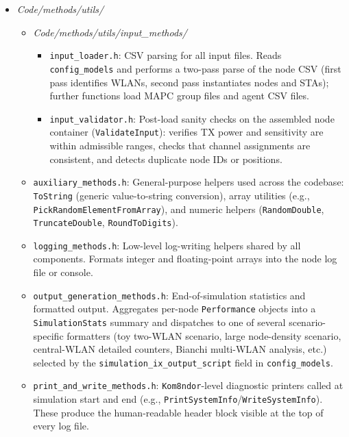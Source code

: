 \documentclass[11pt,a4paper]{article}
\begin{document}
\begin{itemize}
\begin{itemize}
    \end{itemize}
    \item \textit{Code/methods/utils/}
    \begin{itemize}
        \item \textit{Code/methods/utils/input\_methods/}
        \begin{itemize}
            \item \texttt{input\_loader.h}: CSV parsing for all input files. Reads \texttt{config\_models} and performs a two-pass parse of the node CSV (first pass identifies WLANs, second pass instantiates nodes and STAs); further functions load MAPC group files and agent CSV files.
            \item \texttt{input\_validator.h}: Post-load sanity checks on the assembled node container (\texttt{ValidateInput}): verifies TX power and sensitivity are within admissible ranges, checks that channel assignments are consistent, and detects duplicate node IDs or positions.
        \end{itemize}
        \item \texttt{auxiliary\_methods.h}: General-purpose helpers used across the codebase: \texttt{ToString} (generic value-to-string conversion), array utilities (e.g., \texttt{PickRandomElementFromArray}), and numeric helpers (\texttt{RandomDouble}, \texttt{TruncateDouble}, \texttt{RoundToDigits}).
        \item \texttt{logging\_methods.h}: Low-level log-writing helpers shared by all components. Formats integer and floating-point arrays into the node log file or console.
        \item \texttt{output\_generation\_methods.h}: End-of-simulation statistics and formatted output. Aggregates per-node \texttt{Performance} objects into a \texttt{SimulationStats} summary and dispatches to one of several scenario-specific formatters (toy two-WLAN scenario, large node-density scenario, central-WLAN detailed counters, Bianchi multi-WLAN analysis, etc.) selected by the \texttt{simulation\_ix\_output\_script} field in \texttt{config\_models}.
        \item \texttt{print\_and\_write\_methods.h}: \texttt{Kom8ndor}-level diagnostic printers called at simulation start and end (e.g., \texttt{PrintSystemInfo}/\texttt{WriteSystemInfo}). These produce the human-readable header block visible at the top of every log file.
    \end{itemize}    
\end{itemize}
\end{document}
